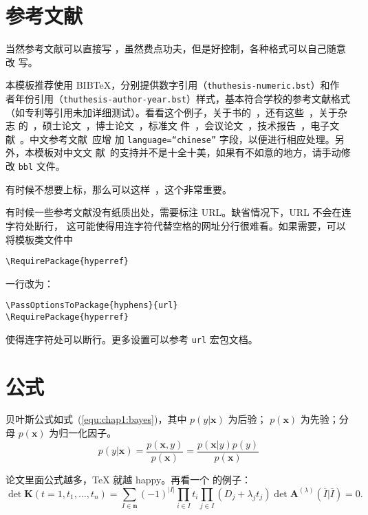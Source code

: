\section{参考文献}
\label{sec:bib}
当然参考文献可以直接写 ，虽然费点功夫，但是好控制，各种格式可以自己随意改
写。

本模板推荐使用 BIB\TeX，分别提供数字引用（\texttt{thuthesis-numeric.bst}）和作
者年份引用（\texttt{thuthesis-author-year.bst}）样式，基本符合学校的参考文献格式
（如专利等引用未加详细测试）。看看这个例子，关于书的~\cite{tex, companion,
  ColdSources}，还有这些~\cite{Krasnogor2004e, clzs, zjsw}，关于杂志
的~\cite{ELIDRISSI94, MELLINGER96, SHELL02}，硕士论文~\cite{zhubajie,
  metamori2004}，博士论文~\cite{shaheshang, FistSystem01}，标准文
件~\cite{IEEE-1363}，会议论文~\cite{DPMG,kocher99}，技术报告~\cite{NPB2}，电子文
献~\cite{chuban2001,oclc2000}。中文参考文献~\cite{cnarticle}应增
加 \texttt{language=``chinese''} 字段，以便进行相应处理。另外，本模板对中文文
献~\cite{cnproceed}的支持并不是十全十美，如果有不如意的地方，请手动修
改 \texttt{bbl} 文件。

有时候不想要上标，那么可以这样~，这个非常重要。

有时候一些参考文献没有纸质出处，需要标注 URL。缺省情况下，URL 不会在连字符处断行，
这可能使得用连字符代替空格的网址分行很难看。如果需要，可以将模板类文件中
\begin{verbatim}
\RequirePackage{hyperref}
\end{verbatim}
一行改为：
\begin{verbatim}
\PassOptionsToPackage{hyphens}{url}
\RequirePackage{hyperref}
\end{verbatim}
使得连字符处可以断行。更多设置可以参考 \texttt{url} 宏包文档。

\section{公式}
\label{sec:equation}
贝叶斯公式如式~(\ref{equ:chap1:bayes})，其中 $p(y|\mathbf{x})$ 为后验；
$p(\mathbf{x})$ 为先验；分母 $p(\mathbf{x})$ 为归一化因子。
\begin{equation}
\label{equ:chap1:bayes}
p(y|\mathbf{x}) = \frac{p(\mathbf{x},y)}{p(\mathbf{x})}=
\frac{p(\mathbf{x}|y)p(y)}{p(\mathbf{x})} 
\end{equation}

论文里面公式越多，\TeX{} 就越 happy。再看一个  的例子：
\newcommand{\envert}[1]{\left\lvert#1\right\rvert} 
\begin{equation}\label{detK2}
\det\mathbf{K}(t=1,t_1,\dots,t_n)=\sum_{I\in\mathbf{n}}(-1)^{\envert{I}}
\prod_{i\in I}t_i\prod_{j\in I}(D_j+\lambda_jt_j)\det\mathbf{A}
^{(\lambda)}(\overline{I}|\overline{I})=0.
\end{equation} 

